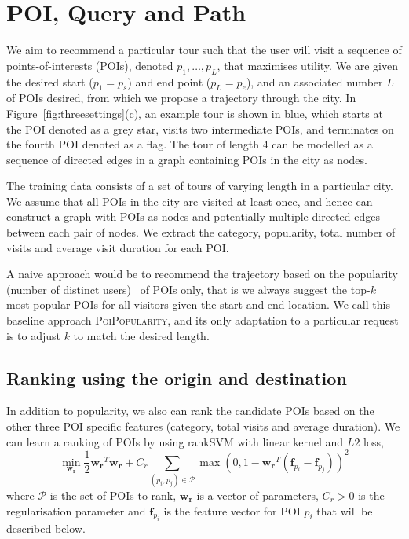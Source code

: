 
\section{POI, Query and Path}
\label{sec:method}

We aim to recommend a particular tour such that the user will visit a sequence of points-of-interests (POIs), denoted $p_1, \ldots, p_L$, that maximises utility. We are given the desired start ($p_1=p_s$) and end point ($p_L=p_e$), and an associated number $L$ of POIs desired, from which we propose a trajectory through the city. In Figure~\ref{fig:threesettings}(c), an example tour is shown in blue, which starts at the POI denoted as a grey star, visits two intermediate POIs, and terminates on the fourth POI denoted as a flag. The tour of length 4 can be modelled as a sequence of directed edges in a graph containing POIs in the city as nodes.

The training data consists of a set of tours of varying length in a particular city. We assume that all POIs in the city are visited at least once, and hence can construct a graph with POIs as nodes and potentially multiple directed edges between each pair of nodes. We extract the category, popularity, total number of visits and average visit duration for each POI.

A naive approach would be to
recommend the trajectory based on the popularity (number of distinct users)~\cite{ht10} of POIs only, that is we always suggest the top-$k$ most popular POIs for all visitors given the start and end location. We call this baseline approach \textsc{PoiPopularity}, and its only adaptation to a particular request is to adjust $k$ to match the desired length.

\subsection{Ranking using the origin and destination}
\label{sec:ranksvm}

In addition to popularity, we also can rank the candidate POIs based on the other three POI specific features (category, total visits and average duration).
We can learn a ranking of POIs by using rankSVM with linear kernel and $L2$ loss\cite{lranksvm},
\begin{displaymath}
\min_{\mathbf{w_r}} \frac{1}{2} \mathbf{w_r}^T \mathbf{w_r} +
                    C_r \sum_{(p_i, p_j) \in \mathcal{P}}
                    \max \left( 0, 1 - \mathbf{w_r}^T (\mathbf{f}_{p_i} - \mathbf{f}_{p_j}) \right)^2
\end{displaymath}
where $\mathcal{P}$ is the set of POIs to rank,
$\mathbf{w_r}$ is a vector of parameters,
$C_r > 0$ is the regularisation parameter and
$\mathbf{f}_{p_i}$ is the feature vector for POI $p_i$ that will be described below.

